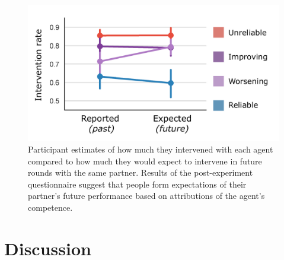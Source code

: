 \documentclass[10pt,letterpaper]{article}
\begin{document}
\begin{figure}[h]
\begin{center}
\includegraphics[width=0.9\linewidth]{img/survey_intervention_expectations_clean.pdf}
\end{center}
\caption{Participant estimates of how much they intervened with each agent compared to how much they would expect to intervene in future rounds with the same partner. Results of the post-experiment questionnaire suggest that people form expectations of their partner's future performance based on attributions of the agent's competence.} 
\label{fig:survey}
\end{figure}



\section{Discussion}
\end{document}
